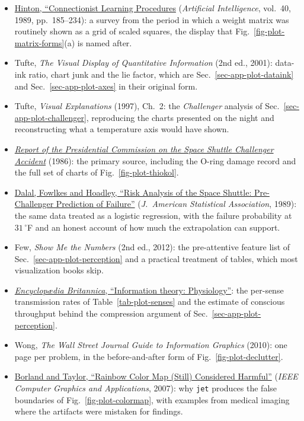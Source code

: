 \begin{itemize}
\item \href{https://doi.org/10.1016/0004-3702(89)90049-0}{Hinton, ``Connectionist Learning Procedures} (\emph{Artificial Intelligence}, vol.~40, 1989, pp.~185--234): a survey from the period in which a weight matrix was routinely shown as a grid of scaled squares, the display that Fig.~\ref{fig-plot-matrix-forms}(a) is named after.
\item Tufte, \emph{The Visual Display of Quantitative Information} (2nd ed., 2001): data-ink ratio, chart junk and the lie factor, which are Sec.~\ref{sec-app-plot-dataink} and Sec.~\ref{sec-app-plot-axes} in their original form.
	\item Tufte, \emph{Visual Explanations} (1997), Ch.~2: the \emph{Challenger} analysis of Sec.~\ref{sec-app-plot-challenger}, reproducing the charts presented on the night and reconstructing what a temperature axis would have shown.
	\item \href{https://www.nasa.gov/history/rogersrep/genindex.htm}{\emph{Report of the Presidential Commission on the Space Shuttle Challenger Accident}} (1986): the primary source, including the O-ring damage record and the full set of charts of Fig.~\ref{fig-plot-thiokol}.
	\item \href{https://doi.org/10.1080/01621459.1989.10478858}{Dalal, Fowlkes and Hoadley, ``Risk Analysis of the Space Shuttle: Pre-Challenger Prediction of Failure''} (\emph{J.\ American Statistical Association}, 1989): the same data treated as a logistic regression, with the failure probability at $31\,^{\circ}$F and an honest account of how much the extrapolation can support.
	\item Few, \emph{Show Me the Numbers} (2nd ed., 2012): the pre-attentive feature list of Sec.~\ref{sec-app-plot-perception} and a practical treatment of tables, which most visualization books skip.
	\item \href{https://www.britannica.com/science/information-theory/Physiology}{\emph{Encyclop\ae dia Britannica}, ``Information theory: Physiology''}: the per-sense transmission rates of Table~\ref{tab-plot-senses} and the estimate of conscious throughput behind the compression argument of Sec.~\ref{sec-app-plot-perception}.
	\item Wong, \emph{The Wall Street Journal Guide to Information Graphics} (2010): one page per problem, in the before-and-after form of Fig.~\ref{fig-plot-declutter}.
	\item \href{https://doi.org/10.1109/VIS.2007.4629435}{Borland and Taylor, ``Rainbow Color Map (Still) Considered Harmful''} (\emph{IEEE Computer Graphics and Applications}, 2007): why \texttt{jet} produces the false boundaries of Fig.~\ref{fig-plot-colormap}, with examples from medical imaging where the artifacts were mistaken for findings.

\end{itemize}
